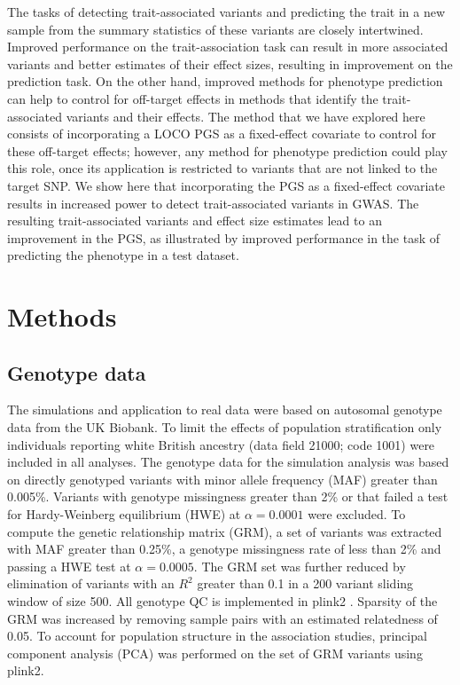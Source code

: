 \documentclass[doublespacing]{bmcart}
\begin{document}
The tasks of detecting trait-associated variants and predicting the trait in a new sample from the summary statistics of these variants are closely intertwined. Improved performance on the trait-association task can result in more associated variants and better estimates of their effect sizes, resulting in improvement on the prediction task. On the other hand, improved methods for phenotype prediction can help to control for off-target effects in methods that identify the trait-associated variants and their effects. The method that we have explored here consists of incorporating a LOCO PGS as a fixed-effect covariate to control for these off-target effects; however, any method for phenotype prediction could play this role, once its application is restricted to variants that are not linked to the target SNP. We show here that incorporating the PGS as a fixed-effect covariate results in increased power to detect trait-associated variants in GWAS. The resulting trait-associated variants and effect size estimates lead to an improvement in the PGS, as illustrated by improved performance in the task of predicting the phenotype in a test dataset. 

 
\section*{Methods}
\subsection*{Genotype data} 

The simulations and application to real data were based on autosomal genotype data from the UK Biobank. To limit the effects of population stratification only individuals reporting white British ancestry (data field 21000; code 1001) were included in all analyses. The genotype data for the simulation analysis was based on directly genotyped variants with minor allele frequency (MAF) greater than 0.005\%. Variants with genotype missingness greater than 2\% or that failed a test for Hardy-Weinberg equilibrium (HWE) at $\alpha{=0.0001}$ were excluded. To compute the genetic relationship matrix (GRM), a set of variants was extracted with MAF greater than 0.25\%, a genotype missingness rate of less than 2\% and passing a HWE test at $\alpha{=0.0005}$. The GRM set was further reduced by elimination of variants with an $R^2$ greater than 0.1 in a 200 variant sliding window of size 500. All genotype QC is implemented in plink2 \cite{chang2015second}. Sparsity of the GRM was increased by removing sample pairs with an estimated relatedness of 0.05. To account for population structure in the association studies, principal component analysis (PCA) was performed on the set of GRM variants using plink2.
\end{document}
